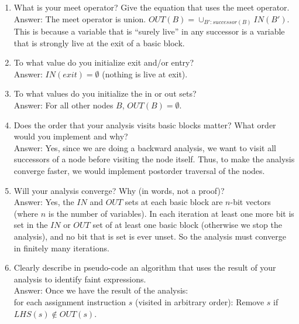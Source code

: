 \begin{enumerate}
\item What is your meet operator? Give the equation that uses the meet operator. \\
Answer: The meet operator is union. $OUT(B) = \cup_{B': successor(B)} IN(B')$. This is because a variable that is ``surely live'' in any successor is a variable that is strongly live at the exit of a basic block. 
\item To what value do you initialize exit and/or entry? \\
Answer: $IN(exit) = \emptyset$ (nothing is live at exit).
\item To what values do you initialize the in or out sets? \\
Answer: For all other nodes $B$, $OUT(B) = \emptyset$.
\item Does the order that your analysis visits basic blocks matter? What order would you implement and why? \\
Answer: Yes, since we are doing a backward analysis, we want to visit all successors of a node before visiting the node itself. Thus, to make the analysis converge faster, we would implement postorder traversal of the nodes. 
\item Will your analysis converge? Why (in words, not a proof)? \\
Answer: Yes, the $IN$ and $OUT$ sets at each basic block are $n$-bit vectors (where $n$ is the number of variables). In each iteration at least one more bit is set in the $IN$ or $OUT$ set of at least one basic block (otherwise we stop the analysis), and no bit that is set is ever unset. So the analysis must converge in finitely many iterations.
\item Clearly describe in pseudo-code an algorithm that uses the result of your analysis to identify faint expressions.\\
Answer: Once we have the result of the analysis:\\
for each assignment instruction $s$ (visited in arbitrary order): Remove $s$ if $LHS(s) \notin OUT(s)$.  
\end{enumerate}